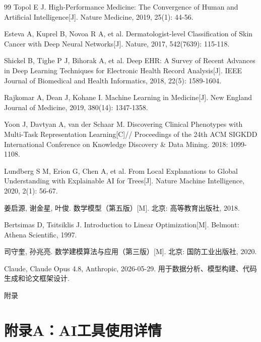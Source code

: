 \documentclass[12pt,a4paper]{ctexart}
\begin{document}
\begin{thebibliography}{99}
 Topol E J. High-Performance Medicine: The Convergence of Human and Artificial Intelligence[J]. Nature Medicine, 2019, 25(1): 44-56.

 Esteva A, Kuprel B, Novoa R A, et al. Dermatologist-level Classification of Skin Cancer with Deep Neural Networks[J]. Nature, 2017, 542(7639): 115-118.

 Shickel B, Tighe P J, Bihorak A, et al. Deep EHR: A Survey of Recent Advances in Deep Learning Techniques for Electronic Health Record Analysis[J]. IEEE Journal of Biomedical and Health Informatics, 2018, 22(5): 1589-1604.

 Rajkomar A, Dean J, Kohane I. Machine Learning in Medicine[J]. New England Journal of Medicine, 2019, 380(14): 1347-1358.

 Yoon J, Davtyan A, van der Schaar M. Discovering Clinical Phenotypes with Multi-Task Representation Learning[C]// Proceedings of the 24th ACM SIGKDD International Conference on Knowledge Discovery & Data Mining. 2018: 1099-1108.

 Lundberg S M, Erion G, Chen A, et al. From Local Explanations to Global Understanding with Explainable AI for Trees[J]. Nature Machine Intelligence, 2020, 2(1): 56-67.

 姜启源, 谢金星, 叶俊. 数学模型（第五版）[M]. 北京: 高等教育出版社, 2018.

 Bertsimas D, Tsitsiklis J. Introduction to Linear Optimization[M]. Belmont: Athena Scientific, 1997.

 司守奎, 孙兆亮. 数学建模算法与应用（第三版）[M]. 北京: 国防工业出版社, 2020.

 Claude, Claude Opus 4.8, Anthropic, 2026-05-29. 用于数据分析、模型构建、代码生成和论文框架设计.

\end{thebibliography}

\newpage
\appendix
\begin{center}
\heiti\Large 附\quad 录
\end{center}

\section*{附录A：AI工具使用详情}
\end{document}
